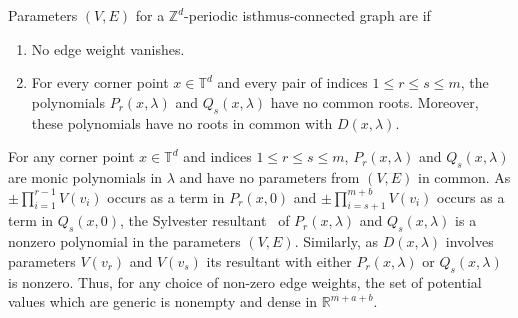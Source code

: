 \documentclass[12pt]{amsart}
\theoremstyle{remark}
\newenvironment{Remark}
{\pushQED{\qed}\renewcommand{\qedsymbol}{$\diamond$}\remark}
{\popQED\endremark}
\newenvironment{Definition}
{\pushQED{\qed}\renewcommand{\qedsymbol}{$\diamond$}\definition}
{\popQED\enddefinition}
\newcommand{\RR}{{\mathbb R}}
\newcommand{\TT}{{\mathbb T}}
\newcommand{\ZZ}{{\mathbb Z}}
\newcommand{\defcolor}[1]{{\color{blue}#1}}
\newcommand{\demph}[1]{\defcolor{{\sl #1}}}
\begin{document}
\begin{Definition}\label{Def:Isthmus-generic}
   Parameters $(V,E)$ for a $\ZZ^d$-periodic isthmus-connected graph are \demph{generic} if 
  \begin{enumerate}
    \item No edge weight vanishes.
    \item For every corner point $x\in\TT^d$ and every pair of indices $1\leq r\leq s\leq m$, the
      polynomials $P_r(x,\lambda)$ and $Q_s(x,\lambda)$ have no common roots.
      Moreover, these polynomials have no roots in common with $D(x,\lambda)$.\qedhere
  \end{enumerate}  
\end{Definition}  

\begin{Remark}\label{Rem:resultant}
  For any corner point $x\in\TT^d$ and indices $1\leq r\leq s\leq m$,
  $P_r(x,\lambda)$ and $Q_s(x,\lambda)$ are monic polynomials in $\lambda$ and have no
  parameters from $(V,E)$ in common.
  As $\pm\prod_{i=1}^{r-1} V(v_i)$ occurs as a term in  $P_r(x,0)$ and $\pm\prod_{i=s+1}^{m+b}V(v_i)$ occurs as a
  term in $Q_s(x,0)$, the Sylvester resultant~\cite[p.~154]{CLO} of $P_r(x,\lambda)$ and $Q_s(x,\lambda)$
  is a nonzero polynomial in the parameters $(V,E)$.
  Similarly, as $D(x,\lambda)$ involves parameters $V(v_r)$ and $V(v_s)$ its resultant with either $P_r(x,\lambda)$ or
  $Q_s(x,\lambda)$ is nonzero.
  Thus, for any choice of non-zero edge weights, the set of potential values which are generic is nonempty and dense in
  $\RR^{m+a+b}$. 
\end{Remark}
\end{document}
